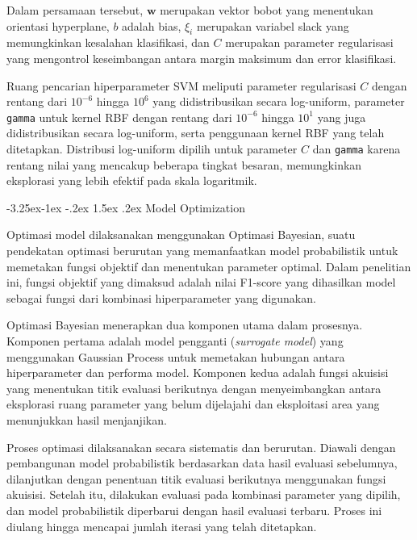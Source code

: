 \documentclass[10pt]{article}
\makeatletter
\renewcommand\subsection{\@startsection{subsection}{2}{\z@}%
  {-3.25ex\@plus -1ex \@minus -.2ex}%
  {1.5ex \@plus .2ex}%
  {\normalfont\itshape\normalsize}}
\makeatother
\begin{document}
\begin{multicols}{2}
    Dalam persamaan tersebut, $\mathbf{w}$ merupakan vektor bobot yang menentukan
    orientasi hyperplane, $b$ adalah bias, $\xi_i$ merupakan variabel slack yang
    memungkinkan kesalahan klasifikasi, dan $C$ merupakan parameter regularisasi
    yang mengontrol keseimbangan antara margin maksimum dan error klasifikasi.

    Ruang pencarian hiperparameter SVM meliputi parameter regularisasi $C$ dengan
    rentang dari $10^{-6}$ hingga $10^{6}$ yang didistribusikan secara log-uniform,
    parameter \texttt{gamma} untuk kernel RBF dengan rentang dari $10^{-6}$ hingga
    $10^{1}$ yang juga didistribusikan secara log-uniform, serta penggunaan kernel
    RBF yang telah ditetapkan. Distribusi log-uniform dipilih untuk parameter $C$
    dan \texttt{gamma} karena rentang nilai yang mencakup beberapa tingkat besaran,
    memungkinkan eksplorasi yang lebih efektif pada skala logaritmik.

    \subsection{Model Optimization}

    Optimasi model dilaksanakan menggunakan Optimasi Bayesian, suatu pendekatan
    optimasi berurutan yang memanfaatkan model probabilistik untuk memetakan fungsi
    objektif dan menentukan parameter optimal. Dalam penelitian ini, fungsi
    objektif yang dimaksud adalah nilai F1-score yang dihasilkan model sebagai
    fungsi dari kombinasi hiperparameter yang digunakan.

    Optimasi Bayesian menerapkan dua komponen utama dalam prosesnya. Komponen
    pertama adalah model pengganti (\textit{surrogate model}) yang menggunakan
    Gaussian Process untuk memetakan hubungan antara hiperparameter dan performa
    model. Komponen kedua adalah fungsi akuisisi yang menentukan titik evaluasi
    berikutnya dengan menyeimbangkan antara eksplorasi ruang parameter yang belum
    dijelajahi dan eksploitasi area yang menunjukkan hasil menjanjikan.

    Proses optimasi dilaksanakan secara sistematis dan berurutan. Diawali dengan
    pembangunan model probabilistik berdasarkan data hasil evaluasi sebelumnya,
    dilanjutkan dengan penentuan titik evaluasi berikutnya menggunakan fungsi
    akuisisi. Setelah itu, dilakukan evaluasi pada kombinasi parameter yang
    dipilih, dan model probabilistik diperbarui dengan hasil evaluasi terbaru.
    Proses ini diulang hingga mencapai jumlah iterasi yang telah ditetapkan.


\end{multicols}
\end{document}
